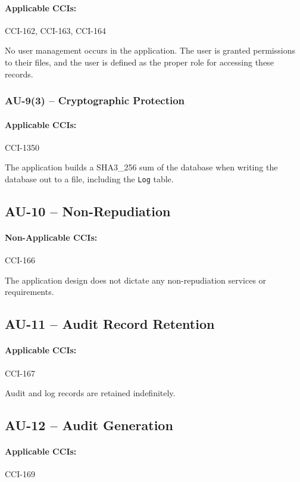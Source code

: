 \documentclass[letterpaper, 10pt, twoside]{article}
\begin{document}
\paragraph{Applicable CCIs:} CCI-162, CCI-163, CCI-164

No user management occurs in the application. The user is granted permissions to their files, and the user is defined as the proper role for accessing these records.

\subsubsection{AU-9(3) -- Cryptographic Protection}

\paragraph{Applicable CCIs:} CCI-1350

The application builds a SHA3\_256 sum of the database when writing the database out to a file, including the \texttt{Log} table.

\subsection{AU-10 -- Non-Repudiation}

\paragraph{Non-Applicable CCIs:} CCI-166

The application design does not dictate any non-repudiation services or requirements.

\subsection{AU-11 -- Audit Record Retention}

\paragraph{Applicable CCIs:} CCI-167

Audit and log records are retained indefinitely.

\subsection{AU-12 -- Audit Generation}

\paragraph{Applicable CCIs:} CCI-169
\end{document}
